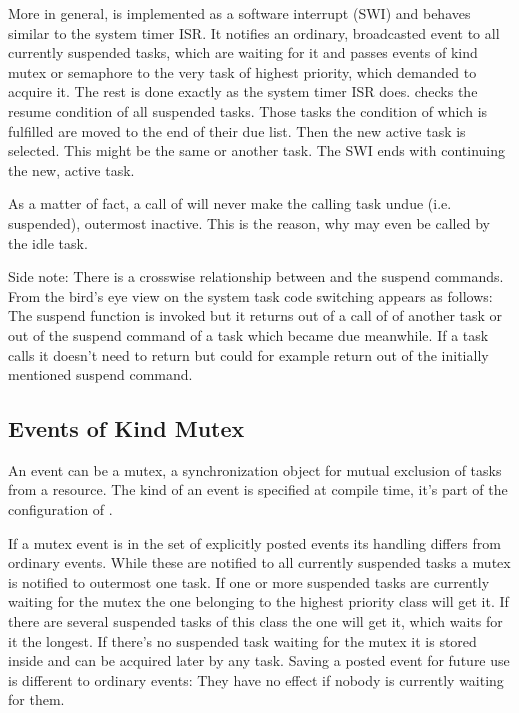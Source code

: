 More in general,  is implemented as a software
interrupt (SWI) and behaves similar to the system timer ISR. It notifies
an ordinary, broadcasted event to all currently suspended tasks, which are
waiting for it and passes events of kind mutex or semaphore to the very
task of highest priority, which demanded to acquire it. The rest is done
exactly as the system timer ISR does.  checks the
resume condition of all suspended tasks. Those tasks the condition of
which is fulfilled are moved to the end of their due list. Then the new
active task is selected. This might be the same or another task. The SWI
ends with continuing the new, active task.

As a matter of fact, a call of  will never make the
calling task undue (i.e. suspended), outermost inactive. This is the
reason, why  may even be called by the idle task.

Side note: There is a crosswise relationship between
 and the suspend commands. From the bird's eye view
on the system task code switching appears as follows: The suspend function
is invoked but it returns out of a call of  of
another task or out of the suspend command of a task which became due
meanwhile. If a task calls  it doesn't need to
return but could for example return out of the initially mentioned suspend
command.


\subsection{Events of Kind Mutex}
\label{secExplicitlyPostEventMutex}

An event can be a mutex, a synchronization object for mutual exclusion
of tasks from a resource. The kind of an event is specified at compile
time, it's part of the configuration of \rtos.

If a mutex event is in the set of explicitly posted events its handling
differs from ordinary events. While these are notified to all currently
suspended tasks a mutex is notified to outermost one task. If one or more
suspended tasks are currently waiting for the mutex the one belonging to
the highest priority class will get it. If there are several suspended
tasks of this class the one will get it, which waits for it the longest.
If there's no suspended task waiting for the mutex it is stored inside
\rtos{} and can be acquired later by any task. Saving a posted event for
future use is different to ordinary events: They have no effect if nobody
is currently waiting for them.

